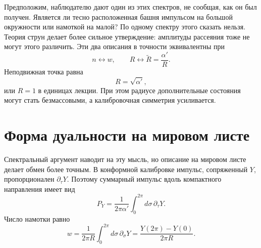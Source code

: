Предположим, наблюдателю дают один из этих спектров, не сообщая, как он был получен. Является ли тесно расположенная башня импульсом на большой окружности или намоткой на малой? По одному спектру этого сказать нельзя. Теория струн делает более сильное утверждение: амплитуды рассеяния тоже не могут этого различить. Эти два описания в точности эквивалентны при
\begin{equation}
  n\longleftrightarrow w,
  \qquad
  R\longleftrightarrow \widetilde R=\frac{\alpha'}{R}.
  \label{eq:l10-radius-duality}
\end{equation}
Неподвижная точка равна
\begin{equation}
  R=\sqrt{\alpha'},
  \label{eq:l10-self-dual-radius}
\end{equation}
или \(R=1\) в единицах лекции. При этом радиусе дополнительные состояния могут стать безмассовыми, а калибровочная симметрия усиливается.

\begin{classroomqa}
\end{classroomqa}

\begin{classroomqa}
\end{classroomqa}

\section{Форма дуальности на мировом листе}

Спектральный аргумент наводит на эту мысль, но описание на мировом листе делает обмен более точным. В конформной калибровке импульс, сопряженный \(Y\), пропорционален \(\partial_\tau Y\). Поэтому суммарный импульс вдоль компактного направления имеет вид
\begin{equation}
  P_Y=\frac{1}{2\pi\alpha'}
      \int_0^{2\pi}d\sigma\,\partial_\tau Y.
  \label{eq:l10-worldsheet-momentum}
\end{equation}
Число намотки равно
\begin{equation}
  w=\frac{1}{2\pi R}
      \int_0^{2\pi}d\sigma\,\partial_\sigma Y
   =\frac{Y(2\pi)-Y(0)}{2\pi R}.
  \label{eq:l10-worldsheet-winding}
\end{equation}

